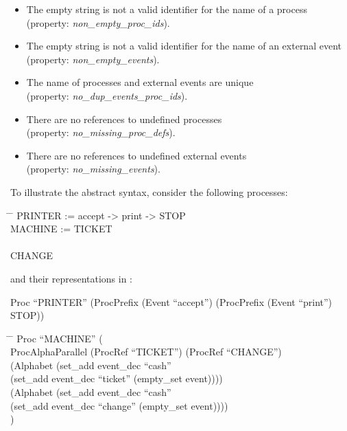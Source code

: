 \begin{itemize}
	\item The empty string is not a valid identifier for the name of a process\\
	(property: \emph{non\_empty\_proc\_ids}).
	\item The empty string is not a valid identifier for the name of an external event\\
	(property: \emph{non\_empty\_events}).
	\item The name of processes and external events are unique\\
	(property: \emph{no\_dup\_events\_proc\_ids}).
	\item There are no references to undefined processes\\
	(property: \emph{no\_missing\_proc\_defs}).
	\item There are no references to undefined external events\\
	(property: \emph{no\_missing\_events}).
\end{itemize}

To illustrate the \CSPcoq{} abstract syntax, consider the following \CSPM{} processes:
%
\begin{tabbing}
	\hspace*{1em}\= \hspace*{5.4em} \= \kill	
	PRINTER := accept -> print -> STOP\\
	MACHINE := TICKET\\
	\>\\
	\>\> CHANGE
\end{tabbing}
%
\noindent{}and their representations in \CSPcoq{}:
%
\begin{flushleft}
	Proc ``PRINTER'' (ProcPrefix (Event ``accept'') (ProcPrefix (Event ``print'') STOP))
\end{flushleft}

\begin{tabbing}
	\hspace*{1em}\= \hspace*{2em} \= \kill
	Proc ``MACHINE'' (\\
	\>	ProcAlphaParallel (ProcRef ``TICKET'') (ProcRef ``CHANGE'')\\
	\>	(Alphabet (set\_add event\_dec ``cash''\\
	\>\> (set\_add event\_dec ``ticket'' (empty\_set event))))\\
	\>	(Alphabet (set\_add event\_dec ``cash''\\
	\>\> (set\_add event\_dec ``change'' (empty\_set event))))\\
	)
\end{tabbing}

